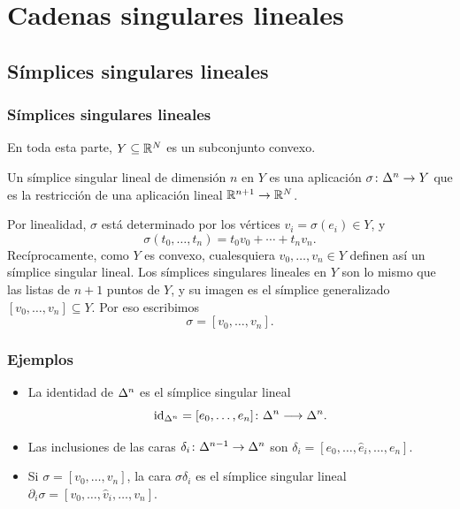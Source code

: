 \section{Cadenas singulares lineales}

\subsection{Símplices singulares lineales}

\begin{frame}
  \frametitle{Símplices singulares lineales}

  En toda esta parte, $Y\subseteq\mathbb{R}^N$ es un subconjunto \alert{convexo}.

  \begin{definition}
    Un \alert{símplice singular lineal} de dimensión $n$ en $Y$ es una
    aplicación $\sigma\colon\Delta^{n}\to Y$ que es la restricción de una
    aplicación lineal $\mathbb{R}^{n+1}\to\mathbb{R}^N$.
  \end{definition}

  Por linealidad, $\sigma$ está determinado por los vértices
  $v_i=\sigma(e_i)\in Y$, y
  \[
    \sigma(t_0,\ldots,t_n)=t_0v_0+\cdots+t_nv_n.
  \]
  Recíprocamente, como $Y$ es convexo, cualesquiera $v_0,\ldots,v_n\in Y$
  definen así un símplice singular lineal. Los símplices singulares lineales
  en $Y$ son \alert{lo mismo} que las listas de $n+1$ puntos de $Y$, y su
  imagen es el símplice generalizado $[v_0,\ldots,v_n]\subseteq Y$. Por eso
  escribimos
  \[
    \sigma=[v_0,\ldots,v_n].
  \]
\end{frame}

\begin{frame}
  \frametitle{Ejemplos}

  \begin{itemize}
    \item La identidad de $\Delta^{n}$ es el símplice singular lineal
      \[
        \operatorname{id}_{\Delta^{n}}=[e_0,\ldots,e_n]\colon
        \Delta^{n}\longrightarrow\Delta^{n}.
      \]
    \item Las inclusiones de las caras
      $\delta_i\colon\Delta^{n-1}\to\Delta^{n}$ son
      $\delta_i=[e_0,\ldots,\widehat{e}_i,\ldots,e_n]$.
    \item Si $\sigma=[v_0,\ldots,v_n]$, la cara $\sigma\delta_i$ es el
      símplice singular lineal $\partial_i\sigma=[v_0,\ldots,\widehat{v}_i,\ldots,v_n]$.
  \end{itemize}
\end{frame}

